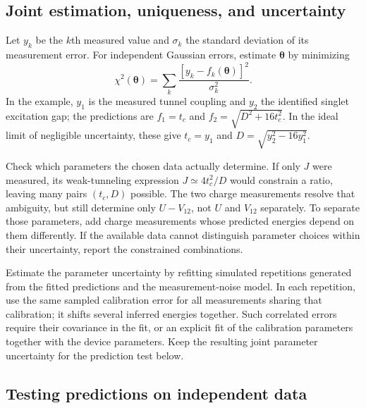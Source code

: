 \subsection{Joint estimation, uniqueness, and uncertainty}
\label{sec:measurement-model-estimation}

Let $y_k$ be the $k$th measured value and $\sigma_k$ the standard
deviation of its measurement error. For independent Gaussian errors, estimate
$\boldsymbol\theta$ by minimizing
\begin{equation}
 \chi^2(\boldsymbol\theta)
   =\sum_k\frac{[y_k-f_k(\boldsymbol\theta)]^2}{\sigma_k^2}.
 \label{eq:measurement-joint-fit}
\end{equation}
In the example, $y_1$ is the measured tunnel coupling and $y_2$
the identified singlet excitation gap; the predictions are
$f_1=t_c$ and $f_2=\sqrt{D^2+16t_c^2}$. In the ideal limit of
negligible uncertainty, these give
$t_c=y_1$ and $D=\sqrt{y_2^2-16y_1^2}$.

Check which parameters the chosen data actually determine. If
only $J$ were measured, its weak-tunneling expression
$J\simeq4t_c^2/D$ would constrain a ratio, leaving many pairs
$(t_c,D)$ possible. The two charge measurements resolve that
ambiguity, but still determine only $U-V_{12}$, not $U$ and
$V_{12}$ separately. To separate those parameters, add charge
measurements whose predicted energies depend on them differently.
If the available data cannot distinguish parameter choices within
their uncertainty, report the constrained combinations.

Estimate the parameter uncertainty by refitting simulated
repetitions generated from the fitted predictions and the
measurement-noise model. In each repetition, use the same sampled
calibration error for all measurements sharing that calibration;
it shifts several inferred energies together. Such correlated errors require
their covariance in the fit, or an explicit fit of the calibration
parameters together with the device parameters. Keep the resulting
joint parameter uncertainty for the prediction test below.

\subsection{Testing predictions on independent data}
\label{sec:uncertainty-model-validation}

